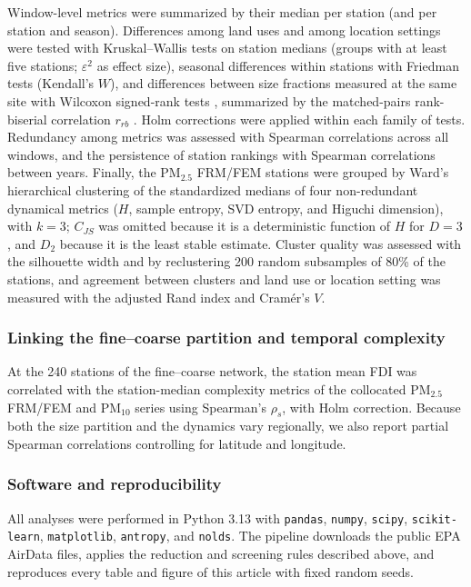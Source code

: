 \documentclass[a4paper,fleqn]{cas-sc}
\begin{document}
Window-level metrics were summarized by their median per station (and per station and season). Differences among land uses and among location settings were tested with Kruskal--Wallis tests on station medians (groups with at least five stations; $\varepsilon^2$ as effect size), seasonal differences within stations with Friedman tests (Kendall's $W$), and differences between size fractions measured at the same site with Wilcoxon signed-rank tests \citep{Wilcoxon1945}, summarized by the matched-pairs rank-biserial correlation $r_{rb}$ \citep{Kerby2014}. Holm corrections were applied within each family of tests. Redundancy among metrics was assessed with Spearman correlations across all windows, and the persistence of station rankings with Spearman correlations between years. Finally, the PM$_{2.5}$ FRM/FEM stations were grouped by Ward's hierarchical clustering \citep{Ward1963} of the standardized medians of four non-redundant dynamical metrics ($H$, sample entropy, SVD entropy, and Higuchi dimension), with $k=3$; $C_{JS}$ was omitted because it is a deterministic function of $H$ for $D=3$, and $D_2$ because it is the least stable estimate. Cluster quality was assessed with the silhouette width and by reclustering 200 random subsamples of 80\% of the stations, and agreement between clusters and land use or location setting was measured with the adjusted Rand index \citep{Hubert1985} and Cram\'er's $V$.

\subsubsection{Linking the fine--coarse partition and temporal complexity}

At the 240 stations of the fine--coarse network, the station mean FDI was correlated with the station-median complexity metrics of the collocated PM$_{2.5}$ FRM/FEM and PM$_{10}$ series using Spearman's $\rho_s$, with Holm correction. Because both the size partition and the dynamics vary regionally, we also report partial Spearman correlations controlling for latitude and longitude.

\subsubsection{Software and reproducibility}

All analyses were performed in Python 3.13 with \texttt{pandas}, \texttt{numpy}, \texttt{scipy}, \texttt{scikit-learn}, \texttt{matplotlib}, \texttt{antropy}, and \texttt{nolds}. The pipeline downloads the public EPA AirData files, applies the reduction and screening rules described above, and reproduces every table and figure of this article with fixed random seeds.
\end{document}
